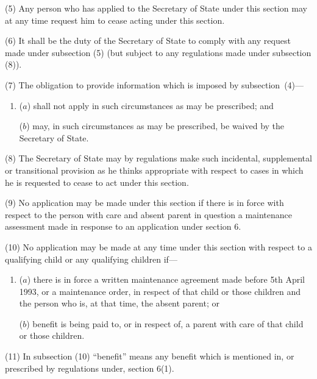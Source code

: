 \documentclass[12pt,a4paper]{article}
\begin{document}
(5) Any person who has applied to the Secretary of State under this section may at any time request him to cease acting under this section.

(6) It shall be the duty of the Secretary of State to comply with any request made under subsection (5)  (but subject to any regulations made under subsection (8)).

(7) The obligation to provide information which is imposed by subsection~(4)—
\begin{enumerate}\item[]
($a$) shall not apply in such circumstances as may be prescribed; and

($b$) may, in such circumstances as may be prescribed, be waived by the Secretary of State.
\end{enumerate}

(8) The Secretary of State may by regulations make such incidental, supplemental or transitional provision as he thinks appropriate with respect to cases in which he is requested to cease to act under this section.

(9) No application may be made under this section if there is in force with respect to the person with care and absent parent in question a maintenance assessment made in response to an application under section 6.

(10) No application may be made at any time under this section with respect to a qualifying child or any qualifying children if—
\begin{enumerate}\item[]
($a$) there is in force a written maintenance agreement made before 5th April 1993, or a maintenance order, in respect of that child or those children and the person who is, at that time, the absent parent; or

($b$) benefit is being paid to, or in respect of, a parent with care of that child or 
those children.
\end{enumerate}

(11) In subsection (10) “benefit” means any benefit which is mentioned in, or prescribed by regulations under, section 6(1).

\end{document}
